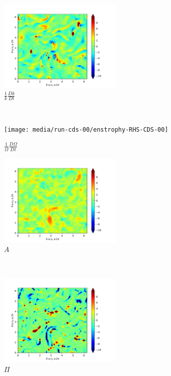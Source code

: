 \begin{figure}[H]
    \begin{subfigure}[H]{0.45\textwidth}
        \includegraphics[height=1.75in]{media/run-cds-00/ke-RHS-CDS-00}
        \caption{$\frac{1}{k} \frac{Dk}{Dt}$}
    \end{subfigure}
    ~
    \begin{subfigure}[H]{0.45\textwidth}
        \texttt{[image: media/run-cds-00/enstrophy-RHS-CDS-00]}
        \caption{$\frac{1}{\Omega} \frac{D \Omega}{Dt}$}
    \end{subfigure}
    \newline
    \begin{subfigure}{0.45\textwidth}
        \includegraphics[height=1.75in]{media/run-cds-00/A-enst-CDS-00}
        \caption{$A$}
    \end{subfigure}
    ~
    \begin{subfigure}{0.45\textwidth}
        \includegraphics[height=1.75in]{media/run-cds-00/trans-enst-CDS-00}
        \caption{$\Pi$}
    \end{subfigure}
    \newline
    \begin{subfigure}{0.45\textwidth}

\end{subfigure}
\end{figure}
